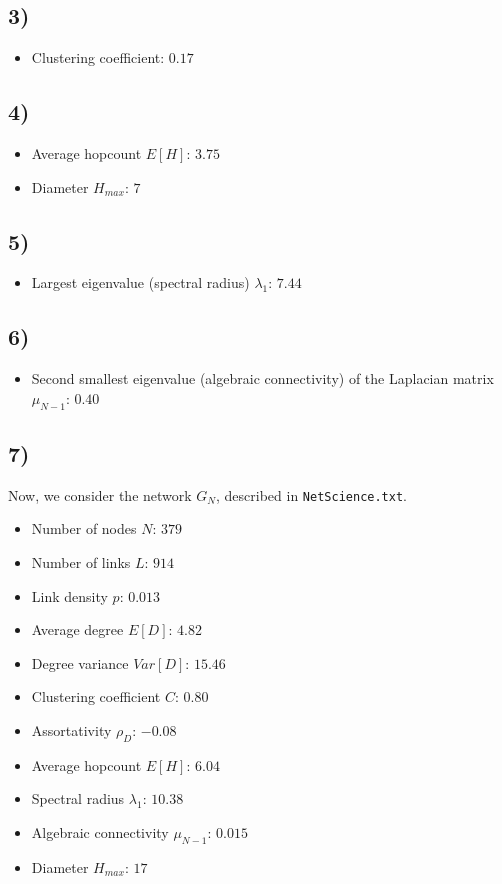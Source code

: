 \documentclass{article}
\begin{document}
\subsection*{3)}

\begin{itemize}
  \item Clustering coefficient: $0.17$
\end{itemize}

\subsection*{4)}

\begin{itemize}
  \item Average hopcount $E[H]$: $3.75$
  \item Diameter $H_{max}$: $7$
\end{itemize}

\subsection*{5)}
\begin{itemize}
  \item Largest eigenvalue (spectral radius) $\lambda_1$: $7.44$
\end{itemize}
\subsection*{6)}

\begin{itemize}
\item Second smallest eigenvalue (algebraic connectivity) of the
  Laplacian matrix $\mu_{N-1}$: $0.40$
\end{itemize}

\subsection*{7)}
Now, we consider the network $G_N$, described in \texttt{NetScience.txt}.

\begin{itemize}
\item Number of nodes $N$: $379$
\item Number of links $L$: $914$
\item Link density $p$: $0.013$
\item Average degree $E[D]$: $4.82$
\item Degree variance $Var[D]$: $15.46$
\item Clustering coefficient $C$: $0.80$
\item Assortativity $\rho_D$: $-0.08$
\item Average hopcount $E[H]$: $6.04$
\item Spectral radius $\lambda_1$: $10.38$
\item Algebraic connectivity $\mu_{N-1}$: $0.015$
\item Diameter $H_{max}$: $17$
\end{itemize}
\end{document}
